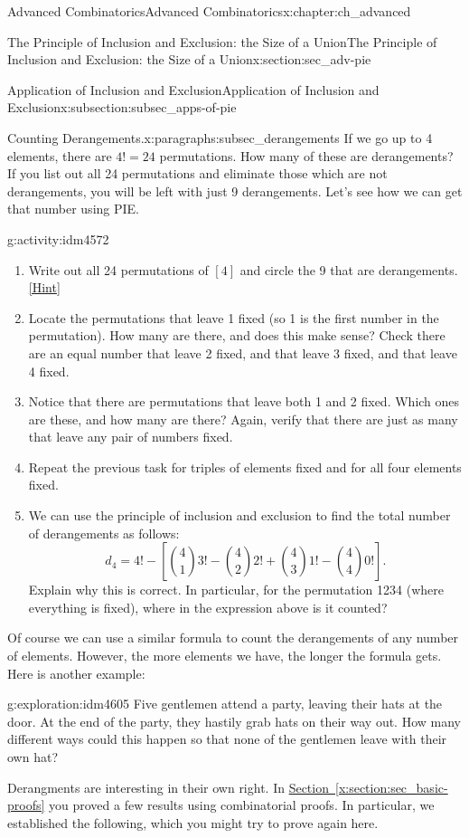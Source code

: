 \documentclass[oneside,10pt,]{book}
\numberwithin{equation}{chapter}
\begin{document}
\begin{chapterptx}{Advanced Combinatorics}{}{Advanced Combinatorics}{}{}{x:chapter:ch_advanced}
\begin{sectionptx}{The Principle of Inclusion and Exclusion: the Size of a Union}{}{The Principle of Inclusion and Exclusion: the Size of a Union}{}{}{x:section:sec_adv-pie}
\begin{subsectionptx}{Application of Inclusion and Exclusion}{}{Application of Inclusion and Exclusion}{}{}{x:subsection:subsec_apps-of-pie}
\begin{paragraphs}{Counting Derangements.}{x:paragraphs:subsec_derangements}
If we go up to 4 elements, there are \(4! = 24\) permutations. How many of these are derangements? If you list out all 24 permutations and eliminate those which are not derangements, you will be left with just 9 derangements. Let's see how we can get that number using PIE.%
\begin{activity}{}{g:activity:idm4572}%
\begin{enumerate}[font=\bfseries,label=(\alph*),ref=\alph*]
\item{}Write out all 24 permutations of \([4]\) and circle the 9 that are derangements.%
\space\hspace*{0pt}\hfill{\tiny\hyperlink{g:hint:idm4577-back}{[Hint]}}\item{}Locate the permutations that leave 1 fixed (so 1 is the first number in the permutation).  How many are there, and does this make sense?  Check there are an equal number that leave 2 fixed, and that leave 3 fixed, and that leave 4 fixed.%
\item{}Notice that there are permutations that leave both 1 and 2 fixed.  Which ones are these, and how many are there?  Again, verify that there are just as many that leave any pair of numbers fixed.%
\item{}Repeat the previous task for triples of elements fixed and for all four elements fixed.%
\item{}We can use the principle of inclusion and exclusion to find the total number of derangements as follows:%
\begin{equation*}
d_4 = 4! - \left[{4 \choose 1}3! - {4 \choose 2}2! + {4 \choose 3} 1! - {4 \choose 4}0!\right].
\end{equation*}
Explain why this is correct.  In particular, for the permutation 1234 (where everything is fixed), where in the expression above is it counted?%
\end{enumerate}
\end{activity}
Of course we can use a similar formula to count the derangements of any number of elements. However, the more elements we have, the longer the formula gets. Here is another example:%
\begin{exploration}{}{g:exploration:idm4605}%
Five gentlemen attend a party, leaving their hats at the door. At the end of the party, they hastily grab hats on their way out. How many different ways could this happen so that none of the gentlemen leave with their own hat?%
\end{exploration}
Derangments are interesting in their own right.  In \hyperref[x:section:sec_basic-proofs]{Section~\ref{x:section:sec_basic-proofs}} you proved a few results using combinatorial proofs.  In particular, we established the following, which you might try to prove again here.%

\end{paragraphs}
\end{subsectionptx}
\end{sectionptx}
\end{chapterptx}
\end{document}
